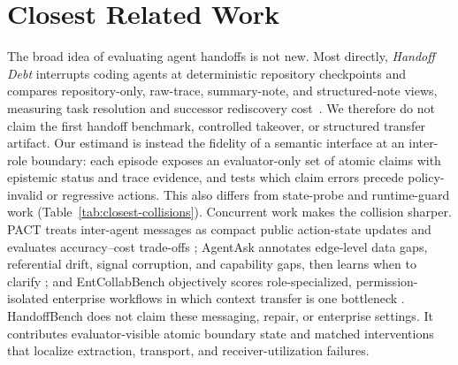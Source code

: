 
\section{Closest Related Work}

The broad idea of evaluating agent handoffs is not new.  Most directly,
\emph{Handoff Debt} interrupts coding agents at deterministic repository
checkpoints and compares repository-only, raw-trace, summary-note, and
structured-note views, measuring task resolution and successor rediscovery
cost~\citep{kc2026handoff}.  We therefore do not claim the first handoff
benchmark, controlled takeover, or structured transfer artifact.  Our estimand
is instead the fidelity of a semantic interface at an inter-role boundary: each
episode exposes an evaluator-only set of atomic claims with epistemic status and
trace evidence, and tests which claim errors precede policy-invalid or
regressive actions.  This also differs from state-probe and runtime-guard work
\citep{jia2026neurostate,she2026provenanceguard}
(Table~\ref{tab:closest-collisions}).
Concurrent work makes the collision sharper.  PACT treats inter-agent messages
as compact public action-state updates and evaluates accuracy--cost trade-offs
\citep{huang2026pact}; AgentAsk annotates edge-level data gaps, referential
drift, signal corruption, and capability gaps, then learns when to clarify
\citep{lin2026agentask}; and EntCollabBench objectively scores role-specialized,
permission-isolated enterprise workflows in which context transfer is one
bottleneck \citep{yu2026entcollab}.  HandoffBench does not claim these messaging,
repair, or enterprise settings.  It contributes evaluator-visible atomic boundary
state and matched interventions that localize extraction, transport, and
receiver-utilization failures.

